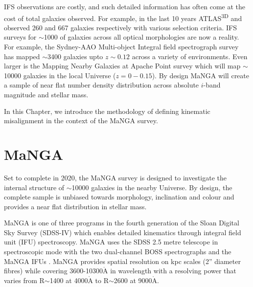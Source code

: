 IFS observations are costly, and such detailed information has often come at the cost of total galaxies observed. For example, in the last 10 years ATLAS\textsuperscript{3D} and  \citep{califa} observed 260 and 667 galaxies respectively with various selection criteria. IFS surveys for $\sim$1000 of galaxies across all optical morphologies are now a reality. For example, the Sydney-AAO  Multi-object  Integral  field  spectrograph  survey \citep[][]{croom2012, bryant2015} has mapped $\sim$3400 galaxies upto $z\sim0.12$ across a variety of environments. Even larger is the Mapping Nearby Galaxies at Apache Point \citep[MaNGA;][]{bundy2015, blanton2017} survey which will map $\sim$10000 galaxies in the local Universe ($z=0-0.15$). By design MaNGA will create a sample of near flat number density distribution across absolute $i$-band magnitude and stellar mass.

In this Chapter, we introduce the methodology of defining kinematic misalignment in the context of the MaNGA survey. 

\section{MaNGA}
Set to complete in 2020, the MaNGA survey is designed to investigate the internal structure of $\sim$10000 galaxies in the nearby Universe. By design, the complete sample is unbiased towards morphology, inclination and colour and provides a near flat distribution in stellar mass. 

MaNGA is one of three programs in the fourth generation of the Sloan Digital Sky Survey (SDSS-IV) which enables detailed kinematics through integral field unit (IFU) spectroscopy. MaNGA uses the SDSS 2.5 metre telescope in spectroscopic mode \citep{gunn2006} with the two dual-channel BOSS spectrographs \citep{smee2013} and the MaNGA IFUs \citep{drory2015}. MaNGA provides spatial resolution on kpc scales (2'' diameter fibres) while covering 3600-10300$\mathrm{\mathring{A}}$ in wavelength with a resolving power that varies from R$\sim$1400 at 4000$\mathrm{\mathring{A}}$ to R$\sim$2600 at 9000$\mathrm{\mathring{A}}$. 

